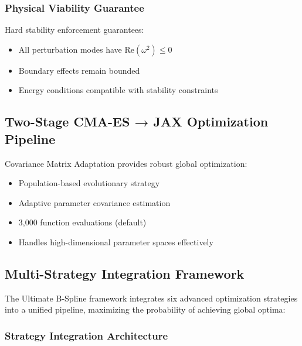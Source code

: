 \documentclass[11pt]{article}
\begin{document}
\subsubsection{Physical Viability Guarantee}

Hard stability enforcement guarantees:
\begin{itemize}
\item All perturbation modes have $\text{Re}(\omega^2) \leq 0$
\item Boundary effects remain bounded
\item Energy conditions compatible with stability constraints
\end{itemize}

\subsection{Two-Stage CMA-ES → JAX Optimization Pipeline}

Covariance Matrix Adaptation provides robust global optimization:
\begin{itemize}
\item Population-based evolutionary strategy
\item Adaptive parameter covariance estimation
\item 3,000 function evaluations (default)
\item Handles high-dimensional parameter spaces effectively
\end{itemize}

\subsection{Multi-Strategy Integration Framework}

The Ultimate B-Spline framework integrates six advanced optimization strategies into a unified pipeline, maximizing the probability of achieving global optima:

\subsubsection{Strategy Integration Architecture}
\end{document}
